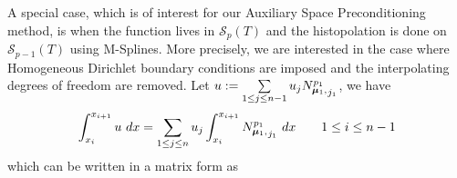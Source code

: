 \noindent
A special case, which is of interest for our Auxiliary Space Preconditioning method, is when the function lives in $\mathcal{S}_p(T)$ and the histopolation is done on $\mathcal{S}_{p-1}(T)$ using M-Splines. More precisely, we are interested in the case where Homogeneous Dirichlet boundary conditions are imposed and the interpolating degrees of freedom are removed. 
\noindent
Let $u := \sum\limits_{1 \le j \le n-1} u_j {N_{\boldsymbol{\mu}_1,}^{p_1}}_{j_1}$, we have
\begin{align}
  \int_{x_i}^{x_{i+1}} u ~dx = \sum\limits_{1 \le j \le n} u_j \int_{x_i}^{x_{i+1}} {N_{\boldsymbol{\mu}_1,}^{p_1}}_{j_1} ~dx \quad \quad 1 \leq i \leq n-1
\end{align}
which can be written in a matrix form as
